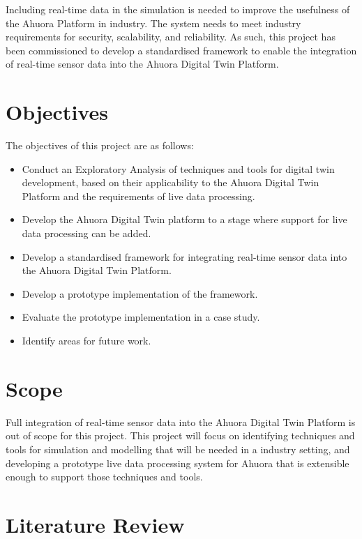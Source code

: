 Including real-time data in the simulation is needed to improve the usefulness of the Ahuora Platform in industry.
The system needs to meet industry requirements for security, scalability, and reliability. As such, this project
has been commissioned to develop a standardised framework to enable the integration of real-time sensor data into the Ahuora Digital Twin Platform.


\section{Objectives}

The objectives of this project are as follows:
\begin{itemize}
    \item Conduct an Exploratory Analysis of techniques and tools for digital twin development, based on their applicability to the Ahuora Digital Twin Platform and the requirements of live data processing.
    \item Develop the Ahuora Digital Twin platform to a stage where support for live data processing can be added.
    \item Develop a standardised framework for integrating real-time sensor data into the Ahuora Digital Twin Platform.
    \item Develop a prototype implementation of the framework.
    \item Evaluate the prototype implementation in a case study.
    \item Identify areas for future work.
\end{itemize}
\section{Scope}

Full integration of real-time sensor data into the Ahuora Digital Twin Platform is out of scope for this project.
This project will focus on identifying techniques and tools for simulation and modelling that will be needed in a industry setting,
and developing a prototype live data processing system for Ahuora that is extensible enough to support those techniques and tools.


\section{Literature Review}

